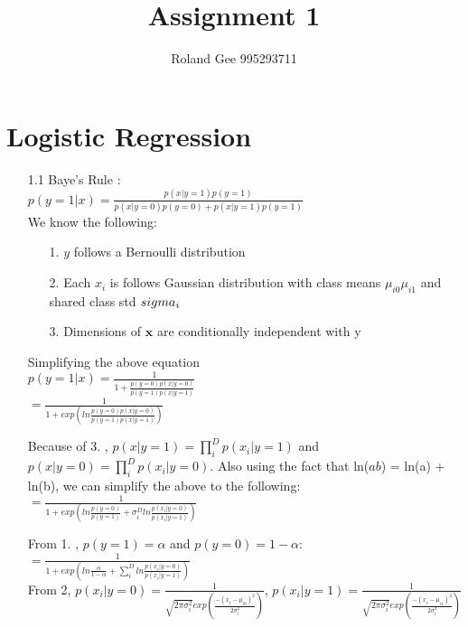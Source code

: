 \documentclass[letterpaper, 12pt]{article}
\title{Assignment 1}
\author{Roland Gee 995293711}
\begin{document}
\maketitle

\section*{Logistic Regression}
\begin{itemize}
	\item[1.1]
		Baye's Rule : \\

		$p(y=1 | x) = \frac{p(x|y = 1)p(y=1)}{p(x|y = 0)p(y = 0) + p(x|y = 1)p(y = 1)}$ \\

		We know the following: \\

		\begin{itemize}
			\item[1.] $y$ follows a Bernoulli distribution
			\item[2.]  Each $x_i$ is follows Gaussian distribution with class means $\mu_{i0} \mu_{i1}$ and shared class std $\\sigma_i$
			\item[3.] Dimensions of $\bm{x}$ are conditionally independent with y
		\end{itemize}

		Simplifying the above equation \\

		$p(y=1 | x) = \frac{1}{1 + \frac{p(y=0)p(x|y = 0)}{p(y = 1)p(x|y = 1)}}$ \\		

		$= \frac{1}{1 + exp(ln\frac{p(y=0)p(x|y = 0)}{p(y = 1)p(x|y = 1)})}$

		Because of 3. , $p(x|y = 1) = \prod_i^D p(x_i|y = 1)$ and $p(x|y = 0) = \prod_i^D p(x_i|y = 0)$. Also using the fact that ln($ab$) = ln(a) + ln(b), we can simplify the above to the following: \\

		$= \frac{1}{1 + exp(ln\frac{p(y=0)}{p(y=1)} + \sigma_i^D ln\frac{p(x_i|y = 0)}{p(x_i|y = 1)})}$

		From 1. , $p(y = 1) = \alpha$ and $p(y = 0) = 1 - \alpha$: \\

		$= \frac{1}{1 + exp(ln\frac{\alpha}{1 - \alpha} + \sum_i^D ln\frac{p(x_i|y = 0)}{p(x_i|y = 1)})}$ \\

		From 2, $p(x_i|y=0) = \frac{1}{\sqrt{2\pi\sigma_i^2}exp(\frac{-(x_i - \mu_{i0})^2}{2\sigma_i^2})}$, $p(x_i|y=1) = \frac{1}{\sqrt{2\pi\sigma_i^2}exp(\frac{-(x_i - \mu_{i1})^2}{2\sigma_i^2})}$


\end{itemize}
\end{document}
